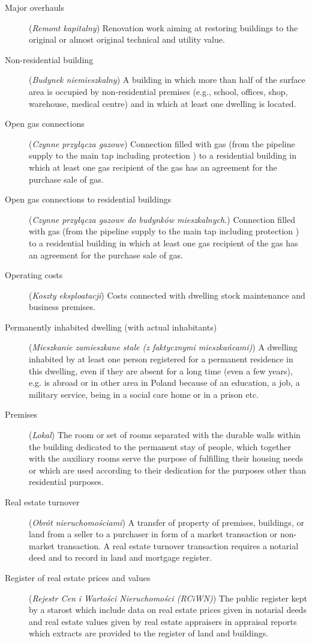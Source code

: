\documentclass[12pt,a4paper]{article}
\begin{document}
\begin{description}
\item[Major overhauls] (\textit{Remont kapitalny}) Renovation work aiming at restoring buildings to the original or almost original technical and utility value.
\item[Non-residential building] (\textit{Budynek niemieszkalny}) A building in which more than half of the surface area is occupied by non-residential premises (e.g., school, offices, shop, warehouse, medical centre) and in which at least one dwelling is located.
\item[Open gas connections] (\textit{Czynne przyłącza gazowe}) Connection filled with gas (from the pipeline supply to the main tap including protection ) to a residential building in which at least one gas recipient of the gas has an agreement for the purchase  sale of gas.
\item[Open gas connections to residential buildings] (\textit{Czynne przyłącza gazowe do budynków mieszkalnych.}) Connection filled with gas  (from the pipeline supply to the main tap including protection ) to a residential building in which at least one gas recipient of the gas has an agreement for the purchase  sale of gas.
\item[Operating costs] (\textit{Koszty eksploatacji}) Costs connected with dwelling stock maintenance and business premises.
\item[Permanently inhabited dwelling (with actual inhabitants)] (\textit{Mieszkanie zamieszkane stale (z faktycznymi mieszkańcami)}) A dwelling inhabited by at least one person registered for a permanent residence in this dwelling, even if they are absent for a long time (even a few years), e.g. is abroad or in other area in Poland because of an education, a job, a military service, being in a social care home or in a prison etc.
\item[Premises] (\textit{Lokal}) The room or set of rooms separated with the durable walls within the building dedicated to the permanent stay of people, which together with the auxiliary rooms serve the purpose of fulfilling their housing needs or which are used according to their dedication for the purposes other than residential purposes.
\item[Real estate turnover] (\textit{Obrót nieruchomościami}) A transfer of property of premises, buildings, or land from a seller to a purchaser in form of a market transaction or non-market transaction. A real estate turnover transaction requires a notarial deed and to record in land and mortgage register.
\item[Register of real estate prices and values] (\textit{Rejestr Cen i Wartości Nieruchomości (RCiWN)}) The public register kept by a starost which include data on real estate prices given in notarial deeds and real estate values given by real estate appraisers in appraisal reports which extracts are provided to the register of land and buildings.

\end{description}
\end{document}
